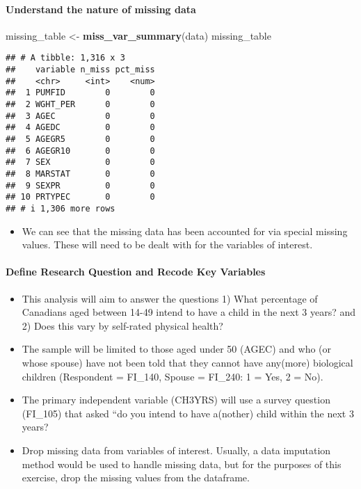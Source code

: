 \documentclass[
]{article}
\newenvironment{Shaded}{\begin{snugshade}}{\end{snugshade}}
\newcommand{\FunctionTok}[1]{\textcolor[rgb]{0.13,0.29,0.53}{\textbf{#1}}}
\newcommand{\NormalTok}[1]{#1}
\newcommand{\OtherTok}[1]{\textcolor[rgb]{0.56,0.35,0.01}{#1}}
\providecommand{\tightlist}{%
  \setlength{\itemsep}{0pt}\setlength{\parskip}{0pt}}
\begin{document}
\paragraph{\texorpdfstring{\textbf{Understand the nature of missing
data}}{Understand the nature of missing data}}\label{understand-the-nature-of-missing-data}

\begin{Shaded}
\begin{Highlighting}[]
\NormalTok{missing\_table }\OtherTok{\textless{}{-}} \FunctionTok{miss\_var\_summary}\NormalTok{(data)}
\NormalTok{missing\_table}
\end{Highlighting}
\end{Shaded}

\begin{verbatim}
## # A tibble: 1,316 x 3
##    variable n_miss pct_miss
##    <chr>     <int>    <num>
##  1 PUMFID        0        0
##  2 WGHT_PER      0        0
##  3 AGEC          0        0
##  4 AGEDC         0        0
##  5 AGEGR5        0        0
##  6 AGEGR10       0        0
##  7 SEX           0        0
##  8 MARSTAT       0        0
##  9 SEXPR         0        0
## 10 PRTYPEC       0        0
## # i 1,306 more rows
\end{verbatim}

\begin{itemize}
\tightlist
\item
  We can see that the missing data has been accounted for via special
  missing values. These will need to be dealt with for the variables of
  interest.
\end{itemize}

\paragraph{\texorpdfstring{\textbf{Define Research Question and Recode
Key
Variables}}{Define Research Question and Recode Key Variables}}\label{define-research-question-and-recode-key-variables}

\begin{itemize}
\tightlist
\item
  This analysis will aim to answer the questions 1) What percentage of
  Canadians aged between 14-49 intend to have a child in the next 3
  years? and 2) Does this vary by self-rated physical health?
\item
  The sample will be limited to those aged under 50 (AGEC) and who (or
  whose spouse) have not been told that they cannot have any(more)
  biological children (Respondent = FI\_140, Spouse = FI\_240: 1 = Yes,
  2 = No).
\item
  The primary independent variable (CH3YRS) will use a survey question
  (FI\_105) that asked ``do you intend to have a(nother) child within
  the next 3 years?
\item
  Drop missing data from variables of interest. Usually, a data
  imputation method would be used to handle missing data, but for the
  purposes of this exercise, drop the missing values from the dataframe.
\end{itemize}
\end{document}
